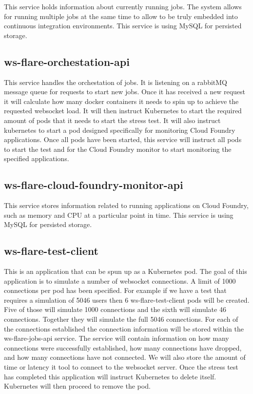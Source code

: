 This service holds information about currently running jobs. The system allows for running multiple jobs at the same time to allow to be truly embedded into continuous integration environments. This service is using MySQL for persisted storage. 

\subsection{ws-flare-orchestation-api}

This service handles the orchestation of jobs. It is listening on a rabbitMQ message queue for requests to start new jobs. Once it has received a new request it will calculate how many docker containers it needs to spin up to achieve the requested websocket load. It will then instruct Kubernetes to start the required amount of pods that it needs to start the stress test. It will also instruct kubernetes to start a pod designed specifically for monitoring Cloud Foundry applications. Once all pods have been started, this service will instruct all pods to start the test and for the Cloud Foundry monitor to start monitoring the specified applications.

\subsection{ws-flare-cloud-foundry-monitor-api}

This service stores information related to running applications on Cloud Foundry, such as memory and CPU at a particular point in time. This service is using MySQL for persisted storage. 

\subsection{ws-flare-test-client}

This is an application that can be spun up as a Kubernetes pod. The goal of this application is to simulate a number of websocket connections. A limit of 1000 connections per pod has been specified. For example if we have a test that requires a simulation of 5046 users then 6 ws-flare-test-client pods will be created. Five of those will simulate 1000 connections and the sixth will simulate 46 connections. Together they will simulate the full 5046 connections. For each of the connections established the connection information will be stored within the ws-flare-jobs-api service. The service will contain information on how many connections were successfully established, how many connections have dropped, and how many connections have not connected. We will also store the amount of time or latency it tool to connect to the websocket server. Once the stress test has completed this application will instruct Kubernetes to delete itself. Kubernetes will then proceed to remove the pod.


